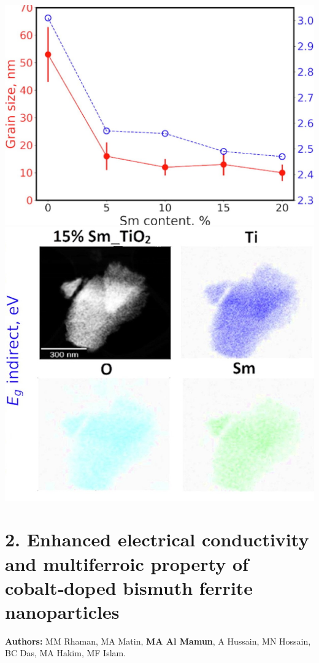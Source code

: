 \documentclass[a4paper,20pt]{article}
\begin{document}
    \begin{minipage}{0.4\linewidth}\begin{flushright}
    	 	\includegraphics[width=0.80\linewidth]{AppSurf1}\\
    	 	\includegraphics[width=0.8\linewidth]{AppSurf2}
    	\end{flushright}\end{minipage}
    	 
\section{\textbf{2. Enhanced electrical conductivity and multiferroic property of cobalt‑doped bismuth ferrite nanoparticles}}

\textbf{Authors:} MM Rhaman, MA Matin, \textbf{MA Al Mamun}, A Hussain, MN Hossain, BC Das, MA Hakim, MF Islam. \\ \vspace{3pt}
\end{document}
